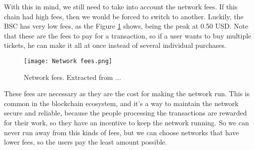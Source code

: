 With this in mind, we still need to take into account the network fees. If this
chain had high fees, then we would be forced to switch to another. Luckily, the
BSC has very low fees, as the Figure \ref{fig:network_fees} shows, being the
peak at 0.50 USD. Note that these are the fees to pay for a transaction, so if
a user wants to buy multiple tickets, he can make it all at once instead of
several individual purchases.

\begin{figure}[H]
	\texttt{[image: Network fees.png]}
	\centering
	\caption{Network fees. Extracted from ...}
	\label{fig:network_fees}
\end{figure}

These fees are necessary as they are the cost for making the network run. This
is common in the blockchain ecosystem, and it's a way to maintain the network
secure and reliable, because the people processing the transactions are
rewarded for their work, so they have an incentive to keep the network running.
So we can never run away from this kinds of fees, but we can choose networks
that have lower fees, so the users pay the least amount possible.
